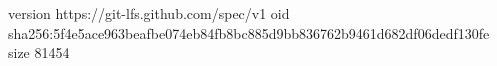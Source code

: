 version https://git-lfs.github.com/spec/v1
oid sha256:5f4e5ace963beafbe074eb84fb8bc885d9bb836762b9461d682df06dedf130fe
size 81454
